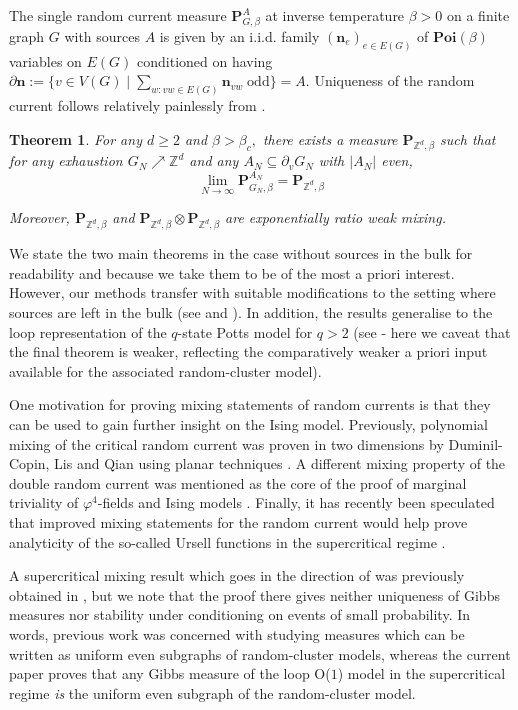 \documentclass[article,11pt,reqno]{amsart}
\newtheorem{theorem}{Theorem}[section]
\begin{document}
The single random current measure $\mathbf{P}^A_{G,\beta}$ at inverse temperature $\beta>0$ on a finite graph $G$ with sources $A$ is given by an i.i.d. family $(\mathbf{n}_e)_{e\in E(G)}$ of $\mathbf{Poi}(\beta)$ variables on $E(G)$ conditioned on having $\partial\mathbf{n}:=\{v\in V(G)\mid \sum_{w:vw\in E(G)} \mathbf{n}_{vw} \;\mathrm{odd}\}=A$. Uniqueness of the random current follows relatively painlessly from .
\begin{theorem} \label{thm:Free-mix}
For any $d\geq 2$ and $\beta>\beta_c,$ there exists a measure $\mathbf{P}_{\mathbb{Z}^d, \beta}$ such that for any exhaustion $G_N\nearrow \mathbb{Z}^d$ and any $A_N\subseteq \partial_v G_N$ with $|A_N|$ even,
$$
\lim_{N\to\infty} \mathbf{P}^{A_N}_{G_N, \beta} =\mathbf{P}_{\mathbb{Z}^d,\beta}
$$
 
 Moreover, $\mathbf{P}_{\mathbb{Z}^d,\beta}$ and $\mathbf{P}_{\mathbb{Z}^d,\beta} \otimes \mathbf{P}_{\mathbb{Z}^d,\beta}$  are exponentially ratio weak mixing. 
\end{theorem}

We state the two main theorems in the case without sources in the bulk for readability and because we take them to be of the most a priori interest. However, our methods transfer with suitable modifications to the setting where sources are left in the bulk (see  and  ). In addition, the results generalise to the loop representation of the $q$-state Potts model for $q>2$ (see  - here we caveat that the final theorem is weaker, reflecting the comparatively weaker a priori input available for the associated random-cluster model).


One motivation for proving mixing statements of random currents is that they can be used to gain further insight on the Ising model. 
Previously, polynomial mixing of the critical random current was proven in two dimensions by Duminil-Copin, Lis and Qian using planar techniques \cite{duminil2021conformal}.
A different mixing property of the double random current \cite[Theorem 6.4]{aizenman2021marginal} was mentioned as the core of the proof of marginal triviality of $\varphi^4$-fields and Ising models \cite{panis2024incipient}. Finally, it has recently been speculated that improved mixing statements for the random current would help prove analyticity of the so-called Ursell functions in the supercritical regime \cite[Remark 1.9]{dalimontegassman}.

A supercritical mixing result which goes in the direction of  was previously obtained in \cite[Theorem 4.11]{hansen2023uniform}, but we note that the proof there gives neither uniqueness of Gibbs measures nor stability under conditioning on events of small probability. In words, previous work was concerned with studying measures which can be written as uniform even subgraphs of random-cluster models, whereas the current paper proves that any Gibbs measure of the loop O($1$) model in the supercritical regime \textit{is} the uniform even subgraph of the random-cluster model.
\end{document}
